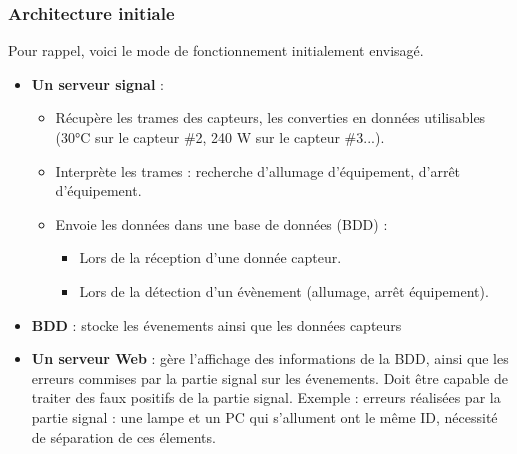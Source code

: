 \documentclass[10pt,a4paper]{article}
\begin{document}
\subsubsection{Architecture initiale}
Pour rappel, voici le mode de fonctionnement initialement envisagé.
\begin{itemize}
  \item \textbf{Un serveur signal} :
  \begin{itemize}
    \item Récupère les trames des capteurs, les converties en données utilisables (30°C sur le capteur \#2, 240 W sur le capteur \#3...).
    \item Interprète les trames : recherche d'allumage d'équipement, d'arrêt d'équipement.
    \item Envoie les données dans une base de données (BDD) :
    \begin{itemize}
      \item Lors de la réception d'une donnée capteur.
      \item Lors de la détection d'un évènement (allumage, arrêt équipement).
    \end{itemize}
  \end{itemize}
  \item \textbf{BDD} : stocke les évenements ainsi que les données capteurs
  \item \textbf{Un serveur Web} : gère l'affichage des informations de la BDD, ainsi que les erreurs commises par la partie signal sur les évenements. Doit être capable de traiter des faux positifs de la partie signal. Exemple : erreurs réalisées par la partie signal : une lampe et un PC qui s'allument ont le même ID, nécessité de séparation de ces élements.
\end{itemize}
\end{document}
